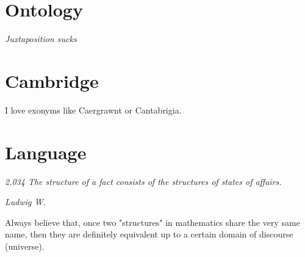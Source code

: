 \section{Ontology}
\epigraph{\footnotesize \textit{Juxtaposition sucks}}{}

\section{Cambridge}
I love exonyms like Caergrawnt or Cantabrigia. \\

\section{Language}
\epigraph{\footnotesize \textit{2.034 The structure of a fact consists of the structures of states of affairs.}}{\footnotesize \textit{Ludwig W.}}
Always believe that, once two "structures" in mathematics share the very same name, then they are definitely equivalent up to a certain domain of discourse (universe).